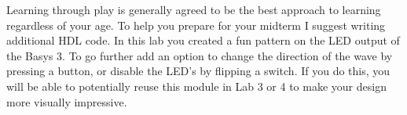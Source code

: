 Learning through play is generally agreed to be the best approach to learning regardless of your age. To help you prepare for your midterm I suggest writing additional HDL code. In this lab you created a fun pattern on the LED output of the Basys 3. To go further add an option to change the direction of the wave by pressing a button, or disable the LED's by flipping a switch. If you do this, you will be able to potentially reuse this module in Lab 3 or 4 to make your design more visually impressive.